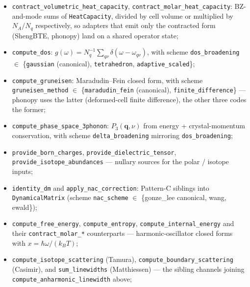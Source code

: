 \documentclass[11pt,a4paper]{article}
\begin{document}
\begin{itemize}[leftmargin=2em, itemsep=0.2em]
{        direct\_inverse]}: same BZ contraction
        $\kappa^{\alpha\beta} = \frac{1}{V N_q}\sum c\, v^\alpha\, F^\beta$;
        the two operations differ only in their input and output state types,
        ensuring $\kappa_\text{RTA}$ is typed as a HiddenSpace and $\kappa_\text{LBTE}$
        as an ObservableSpace;
  \item \texttt{contract\_volumetric\_heat\_capacity}, \texttt{contract\_molar\_heat\_capacity}:
        BZ-and-mode sums of \texttt{HeatCapacity}, divided by cell volume or
        multiplied by $N_A/N_q$ respectively, so adapters that emit only the
        contracted form (ShengBTE, phonopy) land on a shared operator state;
  \item \texttt{compute\_dos}: $g(\omega) = N_q^{-1} \sum_{q\nu}
        \delta(\omega - \omega_{q\nu})$, with scheme
        \texttt{dos\_broadening} $\in$ \{\texttt{gaussian} (canonical),
        \texttt{tetrahedron}, \texttt{adaptive\_scaled}\};
  \item \texttt{compute\_gruneisen}: Maradudin--Fein closed form, with
        scheme \texttt{gruneisen\_method} $\in$ \{\texttt{maradudin\_fein}
        (canonical), \texttt{finite\_difference}\} --- phonopy uses the
        latter (deformed-cell finite difference), the other three codes the
        former;
  \item \texttt{compute\_phase\_space\_3phonon}: $P_3(\mathbf{q}, \nu)$ from
        energy + crystal-momentum conservation, with scheme
        \texttt{delta\_broadening} mirroring \texttt{dos\_broadening};
  \item \texttt{provide\_born\_charges},
        \texttt{provide\_dielectric\_tensor},
        \texttt{provide\_isotope\_abundances} --- nullary sources for the
        polar / isotope inputs;
  \item \texttt{identity\_dm} and \texttt{apply\_nac\_correction}:
        Pattern-C siblings into \texttt{DynamicalMatrix} (scheme
        \texttt{nac\_scheme} $\in$ \{gonze\_lee canonical,
        wang, ewald\});
  \item \texttt{compute\_free\_energy}, \texttt{compute\_entropy},
        \texttt{compute\_internal\_energy} and their
        \texttt{contract\_molar\_*} counterparts --- harmonic-oscillator
        closed forms with $x = \hbar\omega/(k_B T)$;
  \item \texttt{compute\_isotope\_scattering} (Tamura),
        \texttt{compute\_boundary\_scattering} (Casimir), and
        \texttt{sum\_linewidths} (Matthiessen) --- the sibling channels
        joining \texttt{compute\_anharmonic\_linewidth} above;

\end{itemize}
\end{document}
